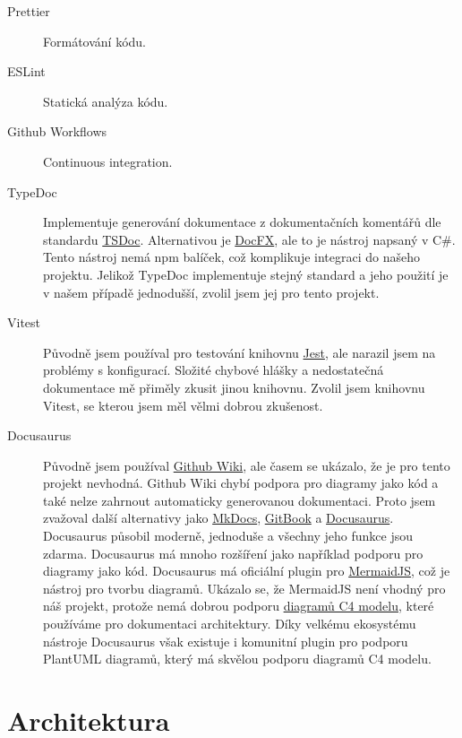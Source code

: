 \begin{description}
    \item[Prettier]
    Formátování kódu.
    \item[ESLint]
    Statická analýza kódu.
    \item[Github Workflows]
    Continuous integration.
    \item[TypeDoc]
    Implementuje generování dokumentace z dokumentačních komentářů dle standardu \href{https://tsdoc.org/}{TSDoc}.
    Alternativou je \href{https://github.com/dotnet/docfx}{DocFX}, ale to je nástroj napsaný v C\#.
    Tento nástroj nemá npm balíček, což komplikuje integraci do našeho projektu.
    Jelikož TypeDoc implementuje stejný standard a jeho použití je v našem případě jednodušší, zvolil jsem jej pro tento projekt.
    \item[Vitest]
    Původně jsem používal pro testování knihovnu \href{https://jestjs.io/}{Jest}, ale narazil jsem na problémy s konfigurací.
    Složité chybové hlášky a nedostatečná dokumentace mě přiměly zkusit jinou knihovnu.
    Zvolil jsem knihovnu Vitest, se kterou jsem měl vělmi dobrou zkušenost.
    \item[Docusaurus]
    Původně jsem používal \href{https://docs.github.com/en/communities/documenting-your-project-with-wikis/about-wikis}{Github Wiki}, ale časem se ukázalo, že je pro tento projekt nevhodná.
    Github Wiki chybí podpora pro diagramy jako kód a také nelze zahrnout automaticky generovanou dokumentaci.
    Proto jsem zvažoval další alternativy jako \href{https://www.mkdocs.org/}{MkDocs}, \href{https://www.gitbook.com/}{GitBook} a \href{https://docusaurus.io/}{Docusaurus}.
    Docusaurus působil moderně, jednoduše a všechny jeho funkce jsou zdarma.
    Docusaurus má mnoho rozšíření jako například podporu pro diagramy jako kód.
    Docusaurus má oficiální plugin pro \href{https://mermaid.js.org/}{MermaidJS}, což je nástroj pro tvorbu diagramů.
    Ukázalo se, že MermaidJS není vhodný pro náš projekt, protože nemá dobrou podporu \href{https://c4model.com/}{diagramů C4 modelu}, které používáme pro dokumentaci architektury.
    Díky velkému ekosystému nástroje Docusaurus však existuje i komunitní plugin pro podporu PlantUML diagramů, který má skvělou podporu diagramů C4 modelu.
\end{description}

\section{Architektura}\label{sec:architektura}

